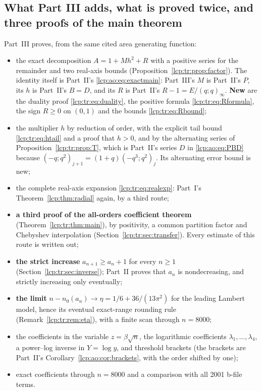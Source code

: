 \documentclass[11pt]{article}
\numberwithin{equation}{section}
\theoremstyle{definition}\newtheorem{definition}[theorem]{Definition}
\theoremstyle{remark}\newtheorem{remark}[theorem]{Remark}
\begin{document}
\subsection{What Part III adds, what is proved twice, and three proofs of the main theorem}\label{lcp:tr:sec:cross}
Part~III proves, from the same cited area generating function:
\begin{itemize}[leftmargin=*,itemsep=0.15em]
\item the exact decomposition $A=1+Mh^2+R$ with a positive series for the
 remainder and two real-axis bounds
 (Proposition~\ref{lcp:tr:prop:factor}). The identity itself is Part~II's
 \eqref{lcp:ao:eq:exactmain}: Part~III's $M$ is Part~II's $P$, its $h$ is
 Part~II's $B=D$, and its $R$ is Part~II's $R-1=E/(q;q)_\infty$.
 \textbf{New} are the duality proof \eqref{lcp:tr:eq:duality}, the positive
 formula \eqref{lcp:tr:eq:Rformula}, the sign $R\ge0$ on $(0,1)$ and the
 bounds \eqref{lcp:tr:eq:Rbound};
\item the multiplier $h$ by reduction of order, with the explicit tail
 bound \eqref{lcp:tr:eq:htail} and a proof that $h>0$, and by the
 alternating series of Proposition~\ref{lcp:tr:prop:T}, which is Part~II's
 series $D$ in \eqref{lcp:ao:eq:PBD} because
 $(-q;q^2)_{j+1}=(1+q)(-q^3;q^2)_j$. Its alternating error bound is new;
\item the complete real-axis expansion \eqref{lcp:tr:eq:realexp}: Part~I's
 Theorem~\ref{lcp:thm:radial} again, by a third route;
\item \textbf{a third proof of the all-orders coefficient theorem}
 (Theorem~\ref{lcp:tr:thm:main}), by positivity, a common partition factor
 and Chebyshev interpolation (Section~\ref{lcp:tr:sec:transfer}). Every
 estimate of this route is written out;
\item \textbf{the strict increase} $a_{n+1}\ge a_n+1$ for every $n\ge1$
 (Section~\ref{lcp:tr:sec:inverse}); Part~II proves that $a_n$ is
 nondecreasing, and strictly increasing only eventually;
\item \textbf{the limit} $n-n_0(a_n)\to\eta=1/6+36/(13\pi^2)$ for the
 leading Lambert model, hence its eventual exact-range rounding rule
 (Remark~\ref{lcp:tr:rem:eta}), with a finite scan through $n=8000$;
\item the coefficients in the variable $z=\beta\sqrt n$, the logarithmic
 coefficients $\lambda_1,\ldots,\lambda_4$, a power--log inverse in
 $Y=\log y$, and threshold brackets (the brackets are Part~II's
 Corollary~\ref{lcp:ao:cor:brackets}, with the order shifted by one);
\item exact coefficients through $n=8000$ and a comparison with all 2001
 b-file terms.
\end{itemize}
\end{document}
